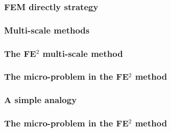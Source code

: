 \documentclass[usenames,dvipsnames]{beamer}
\begin{document}
\begin{frame}
\frametitle{FEM directly strategy}
\begin{figure}[!ht]
\resizebox{1.0\linewidth}{!}{}
\end{figure}
\end{frame}


\begin{frame}
\frametitle{Multi-scale methods}
\begin{figure}[!ht]
\resizebox{1.0\linewidth}{!}{}
\end{figure}
\end{frame}


\begin{frame}
\frametitle{The FE$^2$ multi-scale method}
\begin{figure}[!ht]
\resizebox{1.0\linewidth}{!}{}
\end{figure}
\end{frame}


\begin{frame}
\frametitle{The micro-problem in the FE$^2$ method}
\begin{figure}[!ht]
\resizebox{0.8\linewidth}{!}{}
\end{figure}
\end{frame}


\begin{frame}
\frametitle{A simple analogy}
\begin{figure}[!ht]
\resizebox{0.8\linewidth}{!}{}
\end{figure}
\end{frame}


\begin{frame}
\frametitle{The micro-problem in the FE$^2$ method}
\begin{figure}[!ht]
\resizebox{0.8\linewidth}{!}{}
\end{figure}
\end{frame}
\end{document}
